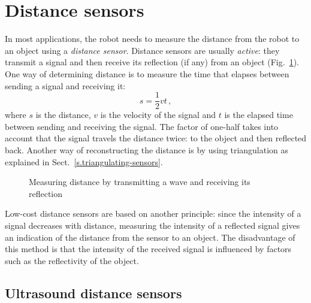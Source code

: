 \section{Distance sensors}\label{s.distance-sensors}

In most applications, the robot needs to measure the distance from the robot to an object using a \textit{distance sensor}. Distance sensors are usually \emph{active}: they transmit a signal and then receive its reflection (if any) from an object (Fig.~\ref{fig.measure-d}). One way of determining distance is to measure the time that elapses between sending a signal and receiving it:
\begin{equation}
s = \frac{1}{2}vt\,,\label{eq.reflected}
\end{equation}
where $s$ is the distance, $v$ is the velocity of the signal and $t$ is the elapsed time between sending and receiving the signal. The factor of one-half takes into account that the signal travels the distance twice: to the object and then reflected back. Another way of reconstructing the distance is by using triangulation as explained in Sect.~\ref{s.triangulating-sensors}.

\begin{figure}
\begin{center}
\end{center}
\caption{Measuring distance by transmitting a wave and receiving its reflection}\label{fig.measure-d}
\end{figure}

Low-cost distance sensors are based on another principle: since the intensity of a signal decreases with distance, measuring the intensity of a reflected signal gives an indication of the distance from the sensor to an object. The disadvantage of this method is that the intensity of the received signal is influenced by factors such as the reflectivity of the object.


\subsection{Ultrasound distance sensors}

